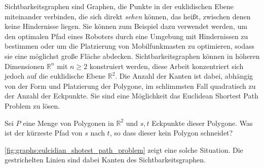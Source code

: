 Sichtbarkeitsgraphen sind Graphen, die Punkte in der euklidischen Ebene miteinander verbinden, die sich direkt \emph{sehen} können, das heißt, zwischen denen keine Hindernisse liegen.
Sie können zum Beispiel dazu verwendet werden, um den optimalen Pfad eines Roboters durch eine Umgebung mit Hindernissen zu bestimmen oder um die Platzierung von Mobilfunkmasten zu optimieren, sodass sie eine möglichst große Fläche abdecken.
Sichtbarkeitsgraphen können in höheren Dimensionen $\mathbb{R}^n$ mit $n \geq 2$ konstruiert werden, diese Arbeit konzentriert sich jedoch auf die euklidische Ebene $\mathbb{R}^2$.
Die Anzahl der Kanten ist dabei, abhängig von der Form und Platzierung der Polygone, im schlimmsten Fall quadratisch zu der Anzahl der Eckpunkte.
Sie sind eine Möglichkeit das Euclidean Shortest Path Problem zu lösen.

\begin{definition}
  Sei $P$ eine Menge von Polygonen in $\mathbb{R}^2$ und $s, t$ Eckpunkte dieser Polygone.
  Was ist der kürzeste Pfad von $s$ nach $t$, so dass dieser kein Polygon schneidet?
\end{definition}

\autoref{fig:graphs:eulcidian_shotest_path_problem} zeigt eine solche Situation.
Die gestrichelten Linien sind dabei Kanten des Sichtbarkeitsgraphen.

